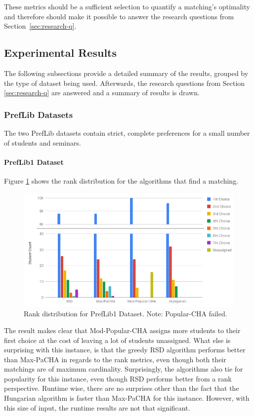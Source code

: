 These metrics should be a sufficient selection to quantify a matching's optimality and therefore should make it possible to answer the research questions from \mbox{Section \ref{sec:research-q}.}

\subsection{Experimental Results}
The following subsections provide a detailed summary of the results, grouped by the type of dataset being used. Afterwards, the research questions from Section \ref{sec:research-q} are answered and a summary of results is drawn.

\subsubsection{PrefLib Datasets}
The two PrefLib datasets contain strict, complete preferences for a small number of students and seminars.

\paragraph{PrefLib1 Dataset}
Figure \ref{fig:preflib1-rank-distribution} shows the rank distribution for the algorithms that find a matching.

\begin{figure}[h!]
  \centering
    \includegraphics[width=0.75\linewidth]{assets/plots/preflib1-cropped.png}
    \caption{Rank distribution for PrefLib1 Dataset. Note: Popular-CHA failed.}
    \label{fig:preflib1-rank-distribution}
\end{figure}

The result makes clear that Mod-Popular-CHA assigns more students to their first choice at the cost of leaving a lot of students unassigned. What else is surprising with this instance, is that the greedy RSD algorithm performs better than Max-PaCHA in regards to the rank metrics, even though both their matchings are of maximum cardinality. Surprisingly, the algorithms also tie for popularity for this instance, even though RSD performs better from a rank perspective. Runtime wise, there are no surprises other than the fact that the Hungarian algorithm is faster than Max-PaCHA for this instance. However, with this size of input, the runtime results are not that significant.

